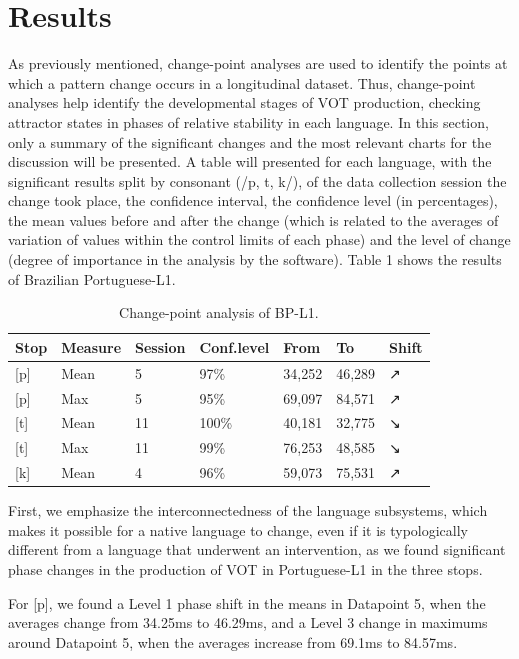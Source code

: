 \section{Results}

As previously mentioned, change-point analyses are used to identify the points
at which a pattern change occurs in a longitudinal dataset. Thus, change-point
analyses help identify the developmental stages of VOT production, checking
attractor states in phases of relative stability in each language. In this
section, only a summary of the significant changes and the most relevant charts
for the discussion will be presented. A table will presented for each language,
with the significant results split by consonant (/p, t, k/), of the data
collection session the change took place, the confidence interval, the
confidence level (in percentages), the mean values before and after the change
(which is related to the averages of variation of values within the control
limits of each phase) and the level of change (degree of importance in the
analysis by the software). Table 1 shows the results of Brazilian
Portuguese-L1.

\begin{table}[h]
\caption{Change-point analysis of BP-L1.}\label{laura-table01}
\begin{tabular}{@{}lllllll@{}}
\toprule
\textbf{Stop} & \textbf{Measure} & \textbf{Session} & \textbf{Conf.level} & \textbf{From} & \textbf{To} & \textbf{Shift} \\
\midrule
{[}p{]} & Mean & 5 & 97\% & 34,252 & 46,289 & ↗ \\
{[}p{]} & Max & 5 & 95\% & 69,097 & 84,571 & ↗ \\
{[}t{]} & Mean & 11 & 100\% & 40,181 & 32,775 & ↘ \\
{[}t{]} & Max & 11 & 99\% & 76,253 & 48,585 & ↘ \\
{[}k{]} & Mean & 4 & 96\% & 59,073 & 75,531 & ↗ \\
\bottomrule
\end{tabular}
\end{table}

First, we emphasize the interconnectedness of the language subsystems, which
makes it possible for a native language to change, even if it is typologically
different from a language that underwent an intervention, as we found
significant phase changes in the production of VOT in Portuguese-L1 in the
three stops.

For [p], we found a Level 1 phase shift in the means in Datapoint 5, when the
averages change from 34.25ms to 46.29ms, and a Level 3 change in maximums
around Datapoint 5, when the averages increase from 69.1ms to 84.57ms.

